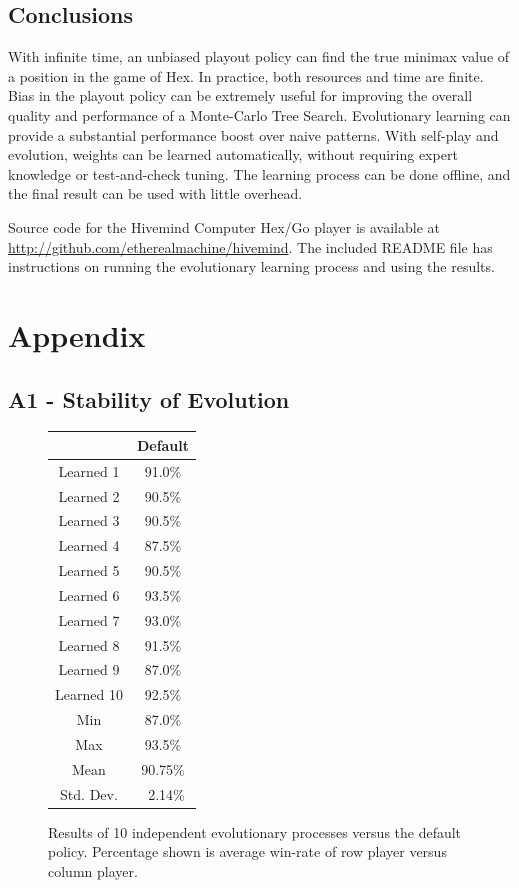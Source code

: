 \documentclass[11pt]{report}
\begin{document}
\subsection{Conclusions}
With infinite time, an unbiased playout policy can find the true minimax value of a position in the game of Hex. In practice, both resources and time are finite. Bias in the playout policy can be extremely useful for improving the overall quality and performance of a Monte-Carlo Tree Search. Evolutionary learning can provide a substantial performance boost over naive patterns. With self-play and evolution, weights can be learned automatically, without requiring expert knowledge or test-and-check tuning. The learning process can be done offline, and the final result can be used with little overhead.

Source code for the Hivemind Computer Hex/Go player is available at \url{http://github.com/etherealmachine/hivemind}. The included README file has instructions on running the evolutionary learning process and using the results.

\section{Appendix}\label{appendix}
\subsection{A1 - Stability of Evolution}
\begin{figure}[t]
	\begin{center}
		\begin{tabular}{c c}
		& Default \\
		\hline
		Learned 1 & 91.0\% \\
		Learned 2 & 90.5\% \\
		Learned 3 & 90.5\% \\
		Learned 4 & 87.5\% \\
		Learned 5 & 90.5\% \\
		Learned 6 & 93.5\% \\
		Learned 7 & 93.0\% \\
		Learned 8 & 91.5\% \\
		Learned 9 & 87.0\% \\
		Learned 10 & 92.5\% \\
		Min & 87.0\% \\
		Max & 93.5\% \\
		Mean & 90.75\% \\
		Std. Dev. & ~2.14\% \\
		\end{tabular}
		\caption{Results of 10 independent evolutionary processes versus the default policy. Percentage shown is average win-rate of row player versus column player.}
		\label{fig:a1results}
	\end{center}
\end{figure}
\end{document}
